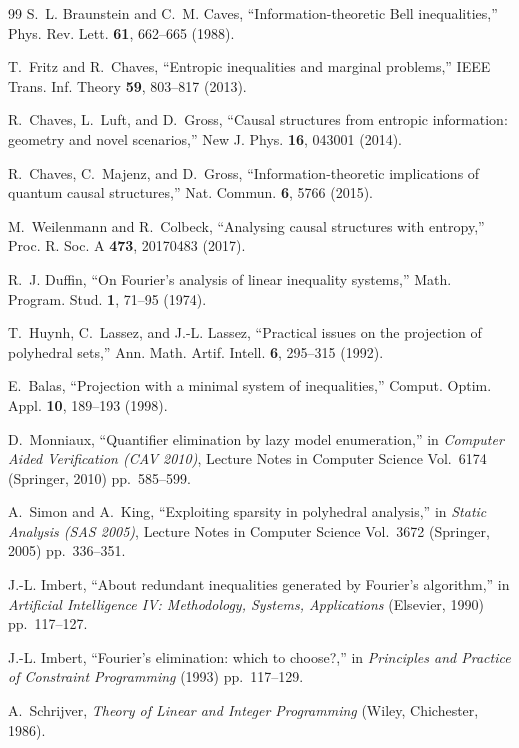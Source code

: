 \documentclass[11pt]{article}
\theoremstyle{definition}
\begin{document}
\begin{thebibliography}{99}
 S.~L. Braunstein and C.~M. Caves, ``Information-theoretic Bell inequalities,'' Phys. Rev. Lett. \textbf{61}, 662--665 (1988).

 T.~Fritz and R.~Chaves, ``Entropic inequalities and marginal problems,'' IEEE Trans. Inf. Theory \textbf{59}, 803--817 (2013).

 R.~Chaves, L.~Luft, and D.~Gross, ``Causal structures from entropic information: geometry and novel scenarios,'' New J. Phys. \textbf{16}, 043001 (2014).

 R.~Chaves, C.~Majenz, and D.~Gross, ``Information-theoretic implications of quantum causal structures,'' Nat. Commun. \textbf{6}, 5766 (2015).

 M.~Weilenmann and R.~Colbeck, ``Analysing causal structures with entropy,'' Proc. R. Soc. A \textbf{473}, 20170483 (2017).

 R.~J. Duffin, ``On Fourier's analysis of linear inequality systems,'' Math. Program. Stud. \textbf{1}, 71--95 (1974).

 T.~Huynh, C.~Lassez, and J.-L. Lassez, ``Practical issues on the projection of polyhedral sets,'' Ann. Math. Artif. Intell. \textbf{6}, 295--315 (1992).

 E.~Balas, ``Projection with a minimal system of inequalities,'' Comput. Optim. Appl. \textbf{10}, 189--193 (1998).

 D.~Monniaux, ``Quantifier elimination by lazy model enumeration,'' in \emph{Computer Aided Verification (CAV 2010)}, Lecture Notes in Computer Science Vol.~6174 (Springer, 2010) pp.~585--599.

 A.~Simon and A.~King, ``Exploiting sparsity in polyhedral analysis,'' in \emph{Static Analysis (SAS 2005)}, Lecture Notes in Computer Science Vol.~3672 (Springer, 2005) pp.~336--351.

 J.-L. Imbert, ``About redundant inequalities generated by Fourier's algorithm,'' in \emph{Artificial Intelligence IV: Methodology, Systems, Applications} (Elsevier, 1990) pp.~117--127.

 J.-L. Imbert, ``Fourier's elimination: which to choose?,'' in \emph{Principles and Practice of Constraint Programming} (1993) pp.~117--129.

 A.~Schrijver, \emph{Theory of Linear and Integer Programming} (Wiley, Chichester, 1986).



\end{thebibliography}
\end{document}
